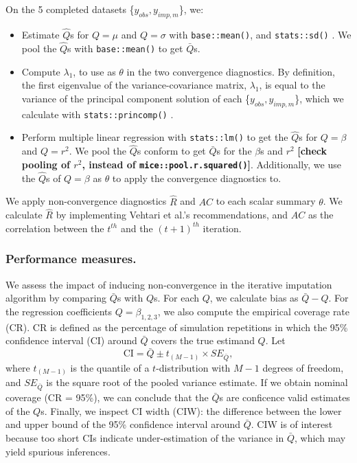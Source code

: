 \documentclass[Royal,times,sageh]{sagej}
\begin{document}
On the 5 completed datasets \{\(y_{obs}, y_{imp, m}\)\}, we:

\begin{itemize}
\item
  Estimate \(\hat{Q}\)s for \(Q= \mu\) and \(Q=\sigma\) with
  \texttt{base::mean()}, and \texttt{stats::sd()} \citep{R}. We pool the
  \(\hat{Q}\)s with \texttt{base::mean()} to get \(\bar{Q}\)s.
\item
  Compute \(\lambda_1\), to use as \(\theta\) in the two convergence
  diagnostics. By definition, the first eigenvalue of the
  variance-covariance matrix, \(\lambda_1\), is equal to the variance of
  the principal component solution of each \{\(y_{obs}, y_{imp, m}\)\},
  which we calculate with \texttt{stats::princomp()} \citep{R}.
\item
  Perform multiple linear regression with \texttt{stats::lm()} \citep{R}
  to get the \(\hat{Q}\)s for \(Q=\beta\) and \(Q=r^2\). We pool the
  \(\hat{Q}\)s conform \citet{vink14} to get \(\bar{Q}\)s for the
  \(\beta\)s and \(r^2\) \textbf{{[}check pooling of \(r^2\), instead of
  \texttt{mice::pool.r.squared()}{]}}. Additionally, we use the
  \(\hat{Q}\)s of \(Q=\beta\) as \(\theta\) to apply the convergence
  diagnostics to.
\end{itemize}

We apply non-convergence diagnostics \(\widehat{R}\) and \(AC\) to each
scalar summary \(\theta\). We calculate \(\widehat{R}\) by implementing
Vehtari et al.'s \citeyearpar{veht19} recommendations, and \(AC\) as the
correlation between the \(t^{th}\) and the \((t+1)^{th}\) iteration.

\hypertarget{performance-measures.}{%
\subsubsection{Performance measures.}\label{performance-measures.}}

We assess the impact of inducing non-convergence in the iterative
imputation algorithm by comparing \(\bar{Q}\)s with \(Q\)s. For each
\(Q\), we calculate bias as \(\bar{Q} - Q\). For the regression
coefficients \(Q=\beta_{1,2,3}\), we also compute the empirical coverage
rate (CR). CR is defined as the percentage of simulation repetitions in
which the 95\% confidence interval (CI) around \(\bar{Q}\) covers the
true estimand \(Q\). Let
\[\text{CI} = \bar{Q} \pm t_{(M-1)} \times SE_{\bar{Q}},\] where
\(t_{(M-1)}\) is the quantile of a \(t\)-distribution with \(M-1\)
degrees of freedom, and \(SE_{\bar{Q}}\) is the square root of the
pooled variance estimate. If we obtain nominal coverage (CR = 95\%), we
can conclude that the \(\bar{Q}\)s are conficence valid estimates of the
\(Q\)s. Finally, we inspect CI width (CIW): the difference between the
lower and upper bound of the 95\% confidence interval around
\(\bar{Q}\). CIW is of interest because too short CIs indicate
under-estimation of the variance in \(\bar{Q}\), which may yield
spurious inferences.
\end{document}
